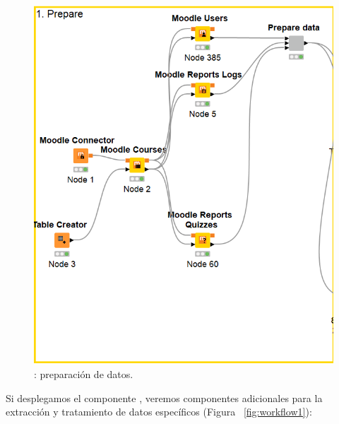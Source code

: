 \begin{figure}[!htb]
	\centering
	\includegraphics[width=1\textwidth]{img/workflow0.png}
	\caption{: preparación de datos.}
	\label{fig:workflow0}
\end{figure}
\FloatBarrier

Si desplegamos el componente , veremos componentes adicionales para la extracción y tratamiento de datos específicos (Figura ~\ref{fig:workflow1}): 

